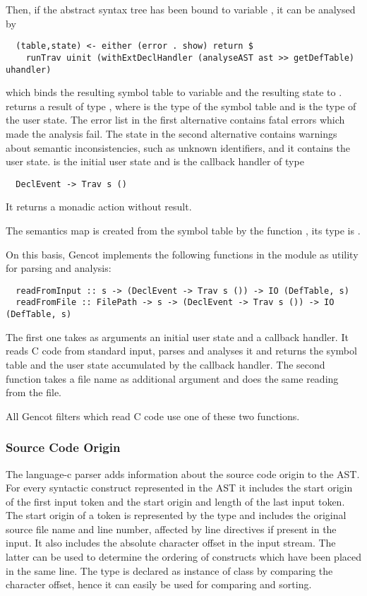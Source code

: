 Then, if the abstract syntax tree has been bound to variable , it can be analysed by
\begin{verbatim}
  (table,state) <- either (error . show) return $ 
    runTrav uinit (withExtDeclHandler (analyseAST ast >> getDefTable) uhandler)
\end{verbatim}
which binds the resulting symbol table to variable  and the resulting state to . 
returns a result of type , where 
is the type of the symbol table and  is the type of the user state. The error list in the first alternative contains 
fatal errors which made the analysis fail. The state in the second alternative contains warnings about semantic inconsistencies, 
such as unknown identifiers, and it contains the user state.  is the initial user state and 
is the callback handler of type
\begin{verbatim}
  DeclEvent -> Trav s ()
\end{verbatim}
It returns a monadic action without result.

The semantics map is created from the symbol table by the function , its type is .

On this basis, Gencot implements the following functions in the module  as utility for parsing and analysis:
\begin{verbatim}
  readFromInput :: s -> (DeclEvent -> Trav s ()) -> IO (DefTable, s)
  readFromFile :: FilePath -> s -> (DeclEvent -> Trav s ()) -> IO (DefTable, s)
\end{verbatim}
The first one takes as arguments an initial user state and a callback handler. It reads C code from standard input, parses
and analyses it and returns the symbol table and the user state accumulated by the callback handler. The second function
takes a file name as additional argument and does the same reading from the file.

All Gencot filters which read C code use one of these two functions.

\subsubsection{Source Code Origin}

The language-c parser adds information about the source code origin to the AST. For every syntactic construct represented
in the AST it includes the start origin of the first input token and the start origin and length of the last input token.
The start origin of a token is represented by the type  and includes the original source file name and 
line number, affected by line directives if present in the input. It also includes the absolute character offset in the 
input stream. The latter can be used to determine the ordering of constructs which have been placed in the same line.
The type  is declared as instance of class  by comparing the character offset, hence it can 
easily be used for comparing and sorting.

